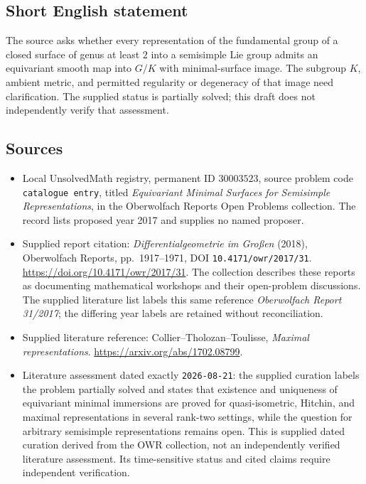 \documentclass[11pt]{article}
\begin{document}
\subsection{Short English statement}
The source asks whether every representation of the fundamental group of a closed surface of genus at least \(2\) into a semisimple Lie group admits an equivariant smooth map into \(G/K\) with minimal-surface image. The subgroup \(K\), ambient metric, and permitted regularity or degeneracy of that image need clarification. The supplied status is partially solved; this draft does not independently verify that assessment.
\subsection{Sources}
\begin{itemize}
\item Local UnsolvedMath registry, permanent ID \(30003523\), source problem code \texttt{catalogue entry}, titled \emph{Equivariant Minimal Surfaces for Semisimple Representations}, in the Oberwolfach Reports Open Problems collection. The record lists proposed year 2017 and supplies no named proposer.
\item Supplied report citation: \emph{Differentialgeometrie im Großen} (2018), Oberwolfach Reports, pp.~1917--1971, DOI \texttt{10.4171/owr/2017/31}. \url{https://doi.org/10.4171/owr/2017/31}. The collection describes these reports as documenting mathematical workshops and their open-problem discussions. The supplied literature list labels this same reference \emph{Oberwolfach Report 31/2017}; the differing year labels are retained without reconciliation.
\item Supplied literature reference: Collier--Tholozan--Toulisse, \emph{Maximal representations}. \url{https://arxiv.org/abs/1702.08799}.
\item Literature assessment dated exactly \texttt{2026-08-21}: the supplied curation labels the problem partially solved and states that existence and uniqueness of equivariant minimal immersions are proved for quasi-isometric, Hitchin, and maximal representations in several rank-two settings, while the question for arbitrary semisimple representations remains open. This is supplied dated curation derived from the OWR collection, not an independently verified literature assessment. Its time-sensitive status and cited claims require independent verification.
\end{itemize}
\end{document}
